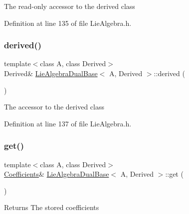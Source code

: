 The read-\/only accessor to the derived class 

Definition at line 135 of file Lie\+Algebra.\+h.

\hypertarget{class_lie_algebra_dual_base_a76d6c80a3a3877e11a793ac466cd14c5}{}\label{class_lie_algebra_dual_base_a76d6c80a3a3877e11a793ac466cd14c5} 
\subsubsection{\texorpdfstring{derived()}{derived()}\hspace{0.1cm}{\footnotesize\ttfamily [2/2]}}
{\footnotesize\ttfamily template$<$class A, class Derived$>$ \\
Derived\& \hyperlink{class_lie_algebra_dual_base}{Lie\+Algebra\+Dual\+Base}$<$ A, Derived $>$\+::derived (\begin{DoxyParamCaption}{ }\end{DoxyParamCaption})\hspace{0.3cm}{\ttfamily [inline]}}

The accessor to the derived class 

Definition at line 137 of file Lie\+Algebra.\+h.

\hypertarget{class_lie_algebra_dual_base_a63e4b601677da3bdce780471e4b9ad56}{}\label{class_lie_algebra_dual_base_a63e4b601677da3bdce780471e4b9ad56} 
\subsubsection{\texorpdfstring{get()}{get()}\hspace{0.1cm}{\footnotesize\ttfamily [1/2]}}
{\footnotesize\ttfamily template$<$class A, class Derived$>$ \\
\hyperlink{class_lie_algebra_dual_base_a9cbdf57fdc61d9ff457e9a9a814f5fdd}{Coefficients}\& \hyperlink{class_lie_algebra_dual_base}{Lie\+Algebra\+Dual\+Base}$<$ A, Derived $>$\+::get (\begin{DoxyParamCaption}{ }\end{DoxyParamCaption})\hspace{0.3cm}{\ttfamily [inline]}}

\begin{DoxyReturn}{Returns}
The stored coefficients 
\end{DoxyReturn}


